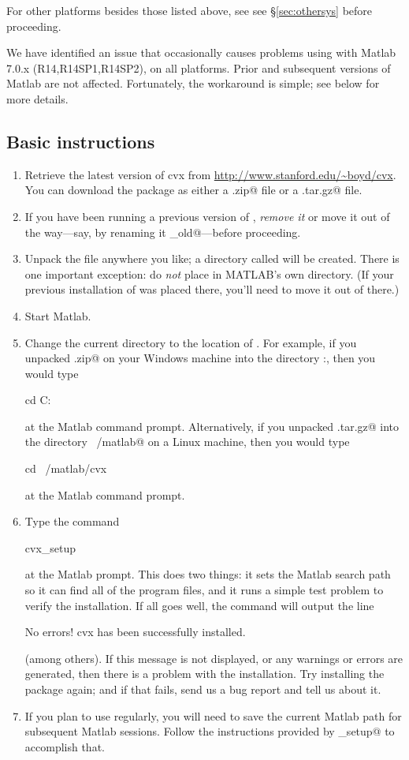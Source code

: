 \documentclass[12pt]{article}
\begin{document}
For other platforms besides those listed above, see
see \S\ref{sec:othersys} before proceeding.

We have identified an issue that occasionally causes problems using \cvx
with Matlab 7.0.x (R14,R14SP1,R14SP2), on all platforms. Prior and subsequent
versions of Matlab are not affected. Fortunately, the workaround is
simple; see \label{sec:sevenprob} below for more details.

\subsection{Basic instructions}
\label{sec:winlin}

\begin{enumerate}
\item Retrieve the latest version of cvx from \url{http://www.stanford.edu/~boyd/cvx}.
You can download the package as either a \verb@.zip@ file or a \verb@.tar.gz@ 
file.
\item If you have been running a previous version of \cvx, \emph{remove it} or
move it out of the way---say, by renaming it \verb@cvx_old@---before proceeding.
\item Unpack the file anywhere you like; a directory called \verb@cvx@ will be created.
There is one important exception: do \emph{not} place \cvx in MATLAB's own
\verb@toolbox@ directory. (If your previous installation of \cvx was placed
there, you'll need to move it out of there.)
\item Start Matlab.
\item Change the current directory to the location of \cvx.
For example, if you unpacked \verb@cvx.zip@ on your Windows machine into the
directory \verb@C:\Matlab\personal@, then you would type
\begin{code}
		cd C:\Matlab\personal\cvx
\end{code}
at the Matlab command prompt. Alternatively, if you unpacked \verb@cvx.tar.gz@
into the directory \verb@~/matlab@ on a Linux machine, then you would type
\begin{code}
		cd ~/matlab/cvx
\end{code}
at the Matlab command prompt.
\item Type the command
\begin{code}
		cvx_setup
\end{code}
at the Matlab prompt. This does two things: 
it sets the Matlab search path so it can find all of the \cvx program files,
and it runs a simple test problem to verify the installation.
If all goes well, the command will output the line
\begin{code}
	No errors! cvx has been successfully installed.
\end{code}
(among others). If this message is not displayed, or any warnings or errors are generated,
then there is a problem with the \cvx installation. Try installing the package
again; and if that fails, send us a bug report and tell us about it.
\item If you plan to use \cvx regularly, you will need to save the current
Matlab path for subsequent Matlab sessions. Follow the instructions provided
by \verb@cvx_setup@ to accomplish that.
\end{enumerate}
\end{document}
